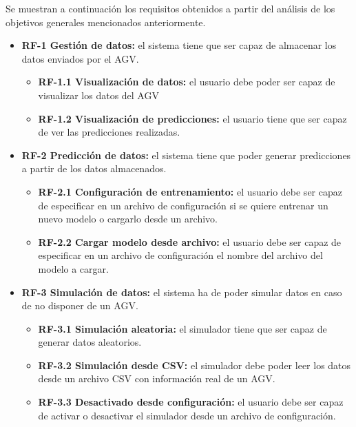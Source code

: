 Se muestran a continuación los requisitos obtenidos a partir del análisis de los objetivos generales mencionados anteriormente.
\begin{itemize}
	\item \textbf{RF-1 Gestión de datos:} el sistema tiene que ser capaz de almacenar los datos enviados por el AGV.
	\begin{itemize}
		\item \textbf{RF-1.1 Visualización de datos:} el usuario debe poder ser capaz de visualizar los datos del AGV
		\item \textbf{RF-1.2 Visualización de predicciones:} el usuario tiene que ser capaz de ver las predicciones realizadas.
	\end{itemize}
	\item \textbf{RF-2 Predicción de datos:} el sistema tiene que poder generar predicciones a partir de los datos almacenados.
	\begin{itemize}
		\item \textbf{RF-2.1 Configuración de entrenamiento: } el usuario debe ser capaz de especificar en un archivo de configuración
			si se quiere entrenar un nuevo modelo o cargarlo desde un archivo.
		\item \textbf{RF-2.2 Cargar modelo desde archivo: } el usuario debe ser capaz de especificar en un archivo de configuración
			el nombre del archivo del modelo a cargar.
	\end{itemize}
	\item \textbf{RF-3 Simulación de datos:} el sistema ha de poder simular datos en caso de no disponer de un AGV.
	\begin{itemize}
		\item \textbf{RF-3.1 Simulación aleatoria:} el simulador tiene que ser capaz de generar datos aleatorios.
		\item \textbf{RF-3.2 Simulación desde CSV:} el simulador debe poder leer los datos desde un archivo CSV con
			información real de un AGV.
		\item \textbf{RF-3.3 Desactivado desde configuración:} el usuario debe ser capaz de activar o desactivar el simulador 
			desde un archivo de configuración.
	\end{itemize}
\end{itemize}

